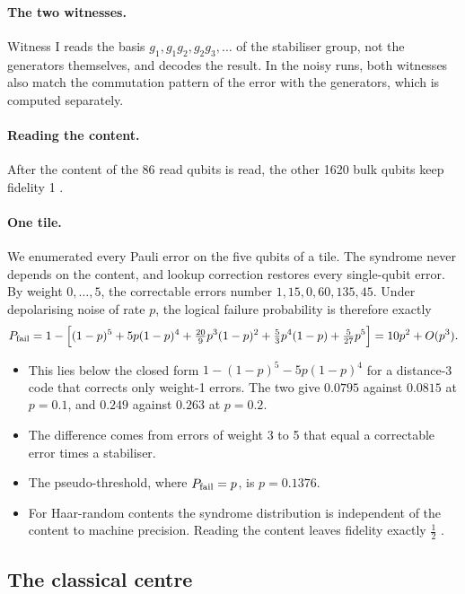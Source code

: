 \paragraph{The two witnesses.} Witness I reads the basis $g_1,g_1g_2,g_2g_3,\dots$ of the stabiliser group, not the generators
themselves, and decodes the result. In the noisy runs, both witnesses also match the commutation pattern of the error with the
generators, which is computed separately.

\paragraph{Reading the content.} After the content of the 86 read qubits is read, the other 1620 bulk qubits keep fidelity 1
.

\paragraph{One tile.} We enumerated every Pauli error on the five qubits of a tile. The syndrome never depends on the content, and lookup
correction restores every single-qubit error. By weight $0,\dots,5$, the correctable errors number $1,15,0,60,135,45$. Under
depolarising noise of rate $p$, the logical failure probability is therefore exactly
\begin{equation}\label{eq:holocode-pfail}
P_{\rm fail}=1-\Bigl[(1-p)^5+5p(1-p)^4+\tfrac{20}{9}p^3(1-p)^2+\tfrac53p^4(1-p)+\tfrac{5}{27}p^5\Bigr]=10p^2+O(p^3).
\end{equation}
\begin{itemize}[nosep]
\item This lies below the closed form $1-(1-p)^5-5p(1-p)^4$ for a distance-3 code that corrects only weight-1 errors. The two give
  $0.0795$ against $0.0815$ at $p=0.1$, and $0.249$ against $0.263$ at $p=0.2$.
\item The difference comes from errors of weight 3 to 5 that equal a correctable error times a stabiliser.
\item The pseudo-threshold, where $P_{\rm fail}=p$, is $p=0.1376$.
\item For Haar-random contents the syndrome distribution is independent of the content to machine precision. Reading the content
  leaves fidelity exactly $\tfrac12$ .
\end{itemize}

\subsection{The classical centre}\label{sec:holocode-centre}

